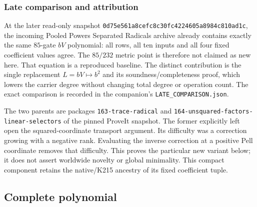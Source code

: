 \documentclass[11pt]{article}
\begin{document}
\subsubsection*{Late comparison and attribution}
At the later read-only snapshot
\texttt{0d75e561a8cefc8c30fc4224605a8984c810ad1c}, the incoming
Pooled Powers Separated Radicals archive already contains exactly the
same $85$-gate $bV$ polynomial: all rows, all ten inputs and all four fixed
coefficient values agree.  The $85/232$ metric point is therefore not
claimed as new here.  That equation is a reproduced baseline.  The
distinct contribution is the single replacement $L=bV\mapsto b^2$
and its soundness/completeness proof, which lowers the carrier degree
without changing total degree or operation count.  The exact comparison
is recorded in the companion's \texttt{LATE\_COMPARISON.json}.

The two parents are packages \texttt{163-trace-radical} and
\texttt{164-unsquared-factors-linear-selectors} of the pinned ProveIt
snapshot.  The former explicitly left open the squared-coordinate
transport argument.  Its difficulty was a correction growing with a
negative rank.  Evaluating the inverse correction at a positive Pell
coordinate removes that difficulty.  This proves the particular new
variant below; it does not assert worldwide novelty or global minimality.
This compact component retains the native/K215 ancestry of its fixed
coefficient tuple.

\subsection{Complete polynomial}
\end{document}
